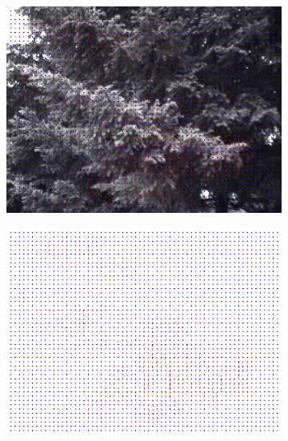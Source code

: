 \documentclass[a4paper,11]{article}
\begin{document}
\begin{figure}[H]
  \begin{subfigure}{0.5\textwidth}
   \centering
   \includegraphics[width=0.8\linewidth]{Evergreen/result_31x31.png}
   \end{subfigure}
   \begin{subfigure}{0.5\textwidth}
    \centering
    \includegraphics[width=0.8\linewidth]{Evergreen/flow_31x31.png}
   \end{subfigure}
     \vspace{1em}
   

\end{figure}
\end{document}
